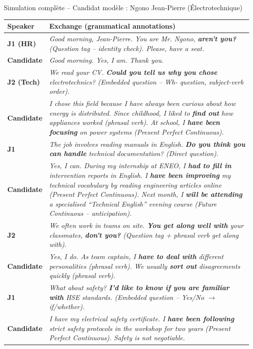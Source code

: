 \documentclass[11pt]{article}
\newcommand{\cle}[1]{{\popxbold\color{popdark}#1}}
\begin{document}
\begin{exoresolu}{Simulation complète -- Candidat modèle : Ngono Jean-Pierre (Électrotechnique)}
\begin{center}
\begin{tabularx}{\linewidth}{|l|X|}\hline
\rowcolor{popblueL}
\textbf{Speaker} & \textbf{Exchange (grammatical annotations)} \\ \hline
\textbf{J1 (HR)} & \emph{Good morning, Jean-Pierre. You are Mr. Ngono, \textbf{aren't you?} (\cle{Question tag} -- identity check). Please, have a seat.} \\ \hline
\textbf{Candidate} & \emph{Good morning. Yes, I am. Thank you.} \\ \hline
\textbf{J2 (Tech)} & \emph{We read your CV. \textbf{Could you tell us why you chose} electrotechnics? (\cle{Embedded question} -- Wh- question, subject-verb order).} \\ \hline
\textbf{Candidate} & \emph{I chose this field because I have always been curious about how energy is distributed. Since childhood, I liked to \textbf{find out} how appliances worked (\cle{phrasal verb}). At school, I \textbf{have been focusing} on power systems (\cle{Present Perfect Continuous}).} \\ \hline
\textbf{J1} & \emph{The job involves reading manuals in English. \textbf{Do you think you can handle} technical documentation? (\cle{Direct question}).} \\ \hline
\textbf{Candidate} & \emph{Yes, I can. During my internship at ENEO, I \textbf{had to fill in} intervention reports in English. I \textbf{have been improving} my technical vocabulary by reading engineering articles online (\cle{Present Perfect Continuous}). Next month, I \textbf{will be attending} a specialised ``Technical English'' evening course (\cle{Future Continuous} -- anticipation).} \\ \hline
\textbf{J2} & \emph{We often work in teams on site. \textbf{You get along well with} your classmates, \textbf{don't you?} (\cle{Question tag} + \cle{phrasal verb} \emph{get along with}).} \\ \hline
\textbf{Candidate} & \emph{Yes, I do. As team captain, I \textbf{have to deal with} different personalities (\cle{phrasal verb}). We usually \textbf{sort out} disagreements quickly (\cle{phrasal verb}).} \\ \hline
\textbf{J1} & \emph{What about safety? \textbf{I'd like to know if you are familiar with} HSE standards. (\cle{Embedded question} -- Yes/No $\rightarrow$ \emph{if/whether}).} \\ \hline
\textbf{Candidate} & \emph{I have my electrical safety certificate. I \textbf{have been following} strict safety protocols in the workshop for two years (\cle{Present Perfect Continuous}). Safety is not negotiable.} \\ \hline

\end{tabularx}
\end{center}
\end{exoresolu}
\end{document}
